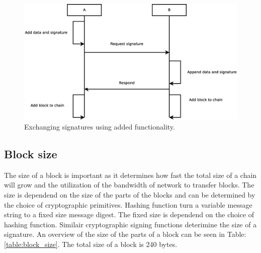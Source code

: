 \begin{figure}
	\centerline{\includegraphics[scale=0.3]{design/figs/exchange_new.eps}}
	\caption{Exchanging signatures using added functionality.}
	\label{fig:exchange-new-sequence}
\end{figure}

\subsection{Block size}
The size of a block is important as it determines how fast the total size of a chain will grow
and the utilization of the bandwidth of network to transfer blocks.
The size is dependend on the size of the parts of the blocks
and can be determined by the choice of cryptographic primitives.
Hashing function turn a variable message string to a fixed size message digest\cite{VanderLubbe-crypto}.
The fixed size is dependend on the choice of hashing function.
Similair cryptographic signing functions deterimine the size of a signature.
An overview of the size of the parts of a block can be seen in Table: \ref{table:block_size}.
The total size of a block is 240 bytes.

